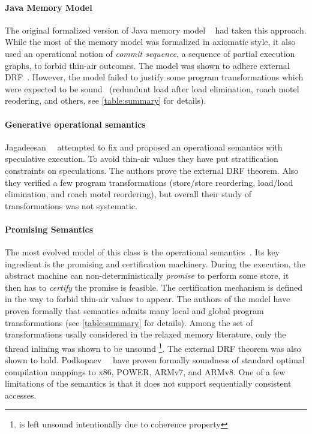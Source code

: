 \paragraph{Java Memory Model}

The original formalized version of Java memory model \JMM~\cite{Manson-al:POPL05}
had taken this approach. While the most of the memory model 
was formalized in axiomatic style, it also used 
an operational notion of \emph{commit sequence}, 
\ie a sequence of partial execution graphs, to forbid thin-air outcomes. 
The model was shown to adhere external DRF~\cite{Huisman-Petri:CONCUR07}.
However, the model failed to justify some program transformations 
which were expected to be sound~\cite{Sevcik-Aspinall:ECOOP08} 
(\eg redundunt load after load elimination, roach motel reodering, and others,
see \cref{table:summary} for details). 

\paragraph{Generative operational semantics}

Jagadeesan~\etal~\cite{Jagadeesan-al:ESOP10} attempted to fix \JMM 
and proposed an operational semantics with speculative execution.
To avoid thin-air values they have put stratification constraints 
on speculations. The authors prove the external DRF theorem. 
Also they verified a few program transformations 
(store/store reordering, load/load elimination, and roach motel reordering), 
but overall their study of transformations was not systematic.  

\paragraph{Promising Semantics}

The most evolved  model of this class is 
the \Promising operational semantics~\cite{Kang-al:POPL17, Lee-al:PLDI20}. 
Its key ingredient is the promising and certification machinery.
During the execution, the abstract machine can 
non-deterministically \emph{promise} to perform some store,
it then has to \emph{certify} the promise is feasible. 
The certification mechanism is defined in the way to forbid thin-air values to appear.
The authors of the model have proven formally 
that \Promising semantics admits many local and global program transformations
(see \cref{table:summary} for details).
Among the set of transformations usally considered 
in the relaxed memory literature, 
only the thread inlining was shown to be unsound%
\footnote{\CSE is left unsound intentionally due to coherence property}. 
The external DRF theorem was also shown to hold. 
Podkopaev~\etal~\cite{Podkopaev-al:ECOOP17, Podkopaev-al:POPL19} have proven formally
soundness of standard optimal compilation mappings to x86, POWER, ARMv7, and ARMv8.
One of a few limitations of the \Promising semantics is that 
it does not support sequentially consistent accesses. 

